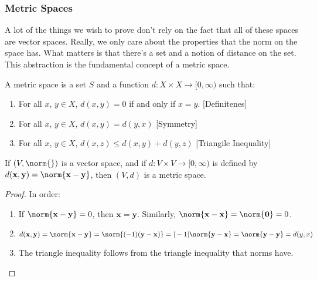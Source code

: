 \documentclass[crop=false,class=article,oneside]{standalone}
\begin{document}
    \subsubsection{Metric Spaces}
        A lot of the things we wish to
        prove don't rely on the fact that all of these
        spaces are vector spaces. Really, we only care about
        the properties that the norm on the space has.
        What matters is that there's a set and a notion
        of distance on the set. This abstraction is the
        fundamental concept of a metric space.
        \begin{definition}
            A metric space is a set $S$ and a function
            $d:{X}\times{X}\rightarrow[0,\infty)$ such that:
            \begin{enumerate}
                \item For all $x$, $y\in{X}$, $d(x,y)=0$
                      if and only if $x=y$.
                      \hfill[Definitenes]
                \item For all $x$, $y\in{X}$,
                      $d(x,y)=d(y,x)$
                      \hfill[Symmetry]
                \item For all $x$, $y\in{X}$,
                      $d(x,z)\leq{d(x,y)+d(y,z)}$
                      \hfill[Triangile Inequality]
            \end{enumerate}
        \end{definition}
        \begin{theorem}
            If $(V,\norm{})$ is a vector space,
            and if $d:{V}\times{V}\rightarrow[0,\infty)$
            is defined by
            $d(\mathbf{x},\mathbf{y})%
             =\norm{\mathbf{x}-\mathbf{y}}$,
            then $(V,d)$ is a metric space.
        \end{theorem}
        \begin{proof}
            In order:
            \begin{enumerate}
                \item If $\norm{\mathbf{x}-\mathbf{y}}=0$,
                      then $\mathbf{x}=\mathbf{y}$.
                      Similarly,
                      $\norm{\mathbf{x}-\mathbf{x}}%
                       =\norm{\mathbf{0}}=0$.
                \item $d(\mathbf{x},\mathbf{y})%
                       =\norm{\mathbf{x}-\mathbf{y}}%
                       =\norm{(-1)(\mathbf{y}-\mathbf{x})}%
                       =|-1|\norm{\mathbf{y}-\mathbf{x}}%
                       =\norm{\mathbf{y}-\mathbf{y}}%
                       =d(y,x)$
                \item The triangle inequality follows
                      from the triangle inequality that
                      norms have.
            \end{enumerate}
        \end{proof}
\end{document}
